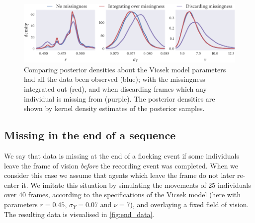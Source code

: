 \begin{figure}[tbp]
  \includegraphics{beg/compare_params.pdf}
  \caption{Comparing posterior densities about the Vicsek model parameters had
    all the data been observed (blue); with the missingness integrated out
    (red), and when discarding frames which any individual is missing from
    (purple). The posterior densities are shown by kernel density estimates
    of the posterior samples.}
  \label{fig:beg_compare}
\end{figure}

\subsection{Missing in the end of a sequence}
\label{ssec:end_missing}

We say that data is missing at the end of a flocking event if some individuals
leave the frame of vision \emph{before} the recording event was completed. When
we consider this case we assume that agents which leave the frame do not later
re-enter it. We imitate this situation by simulating the movements of 25
individuals over 40 frames, according to the specifications of the Vicsek
model (here with parameters $r=0.45$, $\sigma_Y=0.07$ and $\nu=7$), and
overlaying a fixed field of vision. The resulting data is visualised in
\cref{fig:end_data}.

